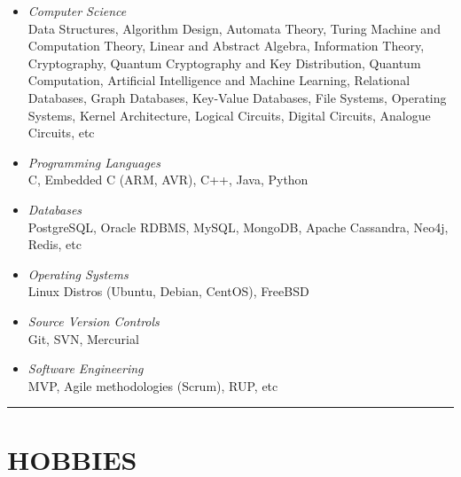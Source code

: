 \documentclass[10pt,a4paper]{article}
\begin{document}
\begin{itemize}
  \item \small \textit {Computer Science} \\
  Data Structures, Algorithm Design, Automata Theory, Turing Machine and Computation Theory, Linear and Abstract Algebra, Information Theory, Cryptography, Quantum Cryptography and Key Distribution, Quantum Computation, Artificial Intelligence and Machine Learning,  Relational Databases, Graph Databases, Key-Value Databases, File Systems, Operating Systems, Kernel Architecture, Logical Circuits, Digital Circuits, Analogue Circuits, etc
  \item \small \textit {Programming Languages} \\
  C, Embedded C (ARM, AVR), C++, Java, Python
  \item \small \textit {Databases} \\
  PostgreSQL, Oracle RDBMS, MySQL, MongoDB, Apache Cassandra, Neo4j, Redis, etc
  \item \small \textit {Operating Systems} \\
  Linux Distros (Ubuntu, Debian, CentOS), FreeBSD
  \item \small \textit {Source Version Controls} \\
  Git, SVN, Mercurial
  \item \small \textit {Software Engineering} \\
  MVP, Agile methodologies (Scrum), RUP, etc
\end{itemize}

\rule {14cm}{0.4pt}

\section{HOBBIES}
\end{document}
